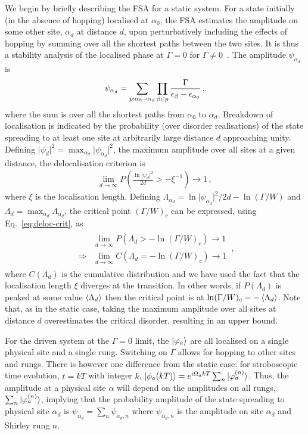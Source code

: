 \documentclass[aps,prl,twocolumn,superscriptaddress,nobalancelastpage,longbibliography]{revtex4-2}
\newcommand\eq[1]{\begin{align}#1\end{align}}
\begin{document}
We begin by briefly describing the FSA for a static system. 
For a state initially (in the absence of hopping) localised at $\alpha_0$, the FSA estimates the amplitude on some other site, $\alpha_d$ at distance $d$, upon perturbatively including the effects of hopping by summing over all the shortest paths between the two sites. It is thus a stability analysis of the localised phase at $\Gamma=0$ for $\Gamma\neq 0$~\cite{pietracaprina2016forward}. The amplitude $\psi_{\alpha_d}$ is
\eq{
\psi_{\alpha_d} = \sum_{p:\alpha_0\shortrightarrow\alpha_d}\prod_{\beta\in p}\frac{\Gamma}{\epsilon_{\beta}-\epsilon_{\alpha_0}}\,,
\label{eq:fsa-stat}
}
where the sum is over all the shortest paths from $\alpha_0$ to $\alpha_d$.
Breakdown of localisation is indicated by the probability (over disorder realisations) of the state spreading to at least one site at arbitrarily large distance $d$ approaching unity.
Defining $\vert\psi_d\vert^2=\max_{\alpha_d}\vert\psi_{\alpha_d}\vert^2$, the maximum amplitude over all sites at a given distance, the delocalisation criterion is
\eq{
\lim_{d\to\infty}P\left(\frac{\ln\vert\psi_d\vert^2}{2d}>-\xi^{-1}\right)\to 1\,,
\label{eq:deloc-crit}
}
where $\xi$ is the localisation length. 
Defining $\Lambda_{\alpha_d} = \ln\vert\psi_{\alpha_d}\vert^2/2d -\ln(\Gamma/W)$ and $\Lambda_d=\max_{\alpha_d}\Lambda_{\alpha_d}$, the critical point $(\Gamma/W)_c$ can be expressed, using Eq.~\ref{eq:deloc-crit}, as 
\eq{
\begin{split}
&\lim_{d\to\infty}P(\Lambda_d>-\ln(\Gamma/W)_c)\to 1\\\Rightarrow & \lim_{d\to\infty}C(\Lambda_d=-\ln(\Gamma/W)_c)\to 1
\end{split}\,,
\label{eq:FSA-critical}
}
where $C(\Lambda_d)$ is the cumulative distribution and we have used the fact that the localisation length $\xi$ diverges at the transition. In other words, if $P(\Lambda_d)$ is peaked at some value $\braket{\Lambda_d}$ then the critical point is at $\ln(\Gamma/W)_c=-\braket{\Lambda_d}$.
Note that, as in the static case, taking the maximum amplitude over all sites at distance $d$ overestimates the critical disorder, resulting in an upper bound.
 
For the driven system at the $\Gamma=0$ limit, the $\ket{\varphi_a}$ are all localised on a single physical site and a single rung. 
Switching on $\Gamma$ allows for hopping to other sites and rungs. 
There is however one difference from the static case: for stroboscopic time evolution, $t=kT$ with integer $k$, $\ket{\phi_a(kT)}=e^{i\Omega_a kT}\sum_{n}\ket{\varphi_a^{(n)}}$. Thus, the amplitude at a physical site $\alpha$ will depend on the amplitudes on all rungs, $\sum_{n}\ket{\varphi_a^{(n)}}$, 
implying that the probability amplitude of the state spreading to physical site $\alpha_d$ is $\psi_{\alpha_d}=\sum_{n}\psi_{\alpha_d,n}$ where $\psi_{\alpha_d,n}$ is the amplitude on site $\alpha_d$ and Shirley rung $n$. 
\end{document}
